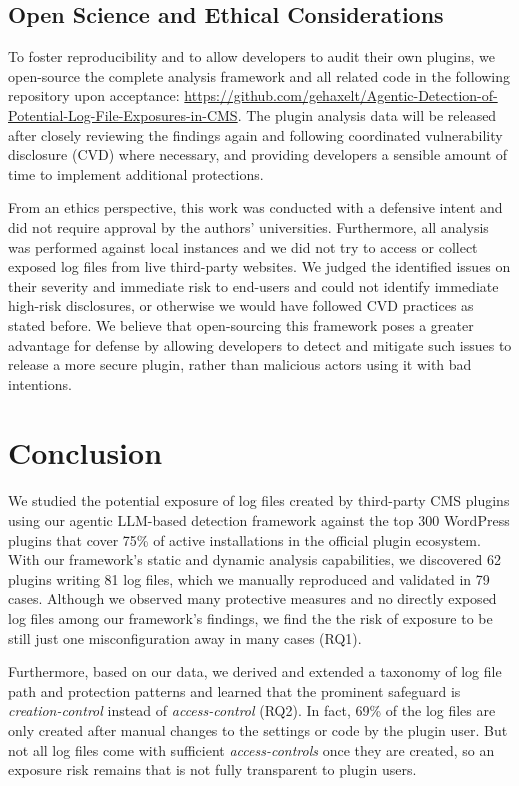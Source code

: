 \documentclass[sigconf]{acmart}
\begin{document}
\subsection{Open Science and Ethical Considerations}\label{sec:disc:openscience}
To foster reproducibility and to allow developers to audit their own plugins, we open-source the complete analysis framework and all related code in the following repository upon acceptance: \url{https://github.com/gehaxelt/Agentic-Detection-of-Potential-Log-File-Exposures-in-CMS}.
The plugin analysis data will be released after closely reviewing the findings again and following coordinated vulnerability disclosure (CVD) where necessary, and providing developers a sensible amount of time to implement additional protections. 

From an ethics perspective, this work was conducted with a defensive intent and did not require approval by the authors' universities. 
Furthermore, all analysis was performed against local instances and we did not try to access or collect exposed log files from live third-party websites. 
We judged the identified issues on their severity and immediate risk to end-users and could not identify immediate high-risk disclosures, or otherwise we would have followed CVD practices as stated before. 
We believe that open-sourcing this framework poses a greater advantage for defense by allowing developers to detect and mitigate such issues to release a more secure plugin, rather than malicious actors using it with bad intentions. 

\section{Conclusion}\label{sec:conclusion}
We studied the potential exposure of log files created by third-party CMS plugins using our agentic LLM-based detection framework against the top 300 WordPress plugins that cover 75\% of active installations in the official plugin ecosystem. 
With our framework's static and dynamic analysis capabilities, we discovered 62 plugins writing 81 log files, which we manually reproduced and validated in 79 cases. Although we observed many protective measures and no directly exposed log files among our framework's findings, we find the the risk of exposure to be still just one misconfiguration away in many cases (RQ1). 

Furthermore, based on our data, we derived and extended a taxonomy of log file path and protection patterns and learned that the prominent safeguard is \emph{creation-control} instead of \emph{access-control} (RQ2). In fact, 69\% of the log files are only created after manual changes to the settings or code by the plugin user. But not all log files come with sufficient \emph{access-controls} once they are created, so an exposure risk remains that is not fully transparent to plugin users.
\end{document}
